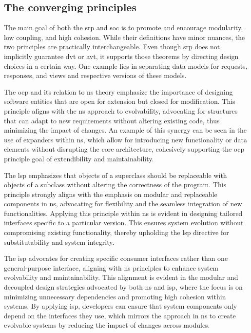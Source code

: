 \subsection{The converging principles} \label{subsec:converging_principles}

The main goal of both the \gls{srp} and \gls{soc} is to promote and encourage modularity,
low coupling, and high cohesion. While their definitions have minor nuances, the two
principles are practically interchangeable. Even though \gls{srp} does not implicitly
guarantee \gls{dvt} or \gls{avt}, it supports those theorems by directing design choices
in a certain way. One example lies in separating data models for requests, responses, and
views and respective versions of these models.

The \gls{ocp} and its relation to \gls{ns} theory emphasize the importance of designing
software entities that are open for extension but closed for modification. This principle
aligns with the \gls{ns} approach to evolvability, advocating for structures that can
adapt to new requirements without altering existing code, thus minimizing the impact of
changes. An example of this synergy can be seen in the use of expanders within \gls{ns},
which allow for introducing new functionality or data elements without disrupting the core
architecture, cohesively supporting the \gls{ocp} principle goal of extendibility and
maintainability.

The \gls{lsp} emphasizes that objects of a superclass should be replaceable with objects
of a subclass without altering the correctness of the program. This principle strongly
aligns with the emphasis on modular and replaceable components in \gls{ns}, advocating for
flexibility and the seamless integration of new functionalities. Applying this principle
within \gls{ns} is evident in designing tailored interfaces specific to a particular
version. This ensures system evolution without compromising existing functionality,
thereby upholding the \gls{lsp} directive for substitutability and system integrity.

The \gls{isp} advocates for creating specific consumer interfaces rather than one
general-purpose interface, aligning with \gls{ns} principles to enhance system
evolvability and maintainability. This alignment is evident in the modular and decoupled
design strategies advocated by both \gls{ns} and \gls{isp}, where the focus is on
minimizing unnecessary dependencies and promoting high cohesion within systems. By
applying \gls{isp}, developers can ensure that system components only depend on the
interfaces they use, which mirrors the approach in \gls{ns} to create evolvable systems by
reducing the impact of changes across modules.

